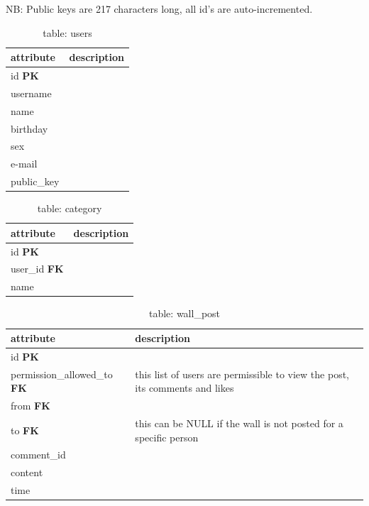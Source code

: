 NB: Public keys are 217 characters long, all id's are auto-incremented.

\begin{table}[h]
    \centering
    \begin{tabular}{ll}
    attribute      & description\\ \hline
    id \textbf{PK} & \\
    username       & \\
    name           & \\
    birthday       & \\
    sex            & \\
    e-mail         & \\
    public\_key    & \\
    \end{tabular}
    \caption{table: users}
\end{table}

\begin{table}[h]
    \centering
    \begin{tabular}{ll}
    attribute            & description\\ \hline
    id \textbf{PK}       & \\
    user\_id \textbf{FK} & \\
    name                 & \\
    \end{tabular}
    \caption{table: category}
\end{table}

\begin{table}[h]
    \centering
    \begin{tabular}{ll}
    attribute                           & description\\ \hline
    id \textbf{PK}                      & \\
    permission\_allowed\_to \textbf{FK} & this list of users are permissible to view the post, its comments and likes\\
    from \textbf{FK}                    & \\
    to \textbf{FK}                      & this can be NULL if the wall is not posted for a specific person\\
    comment\_id                         & \\
    content                             & \\
    time                                & \\
    \end{tabular}
    \caption{table: wall\_post}
\end{table}

